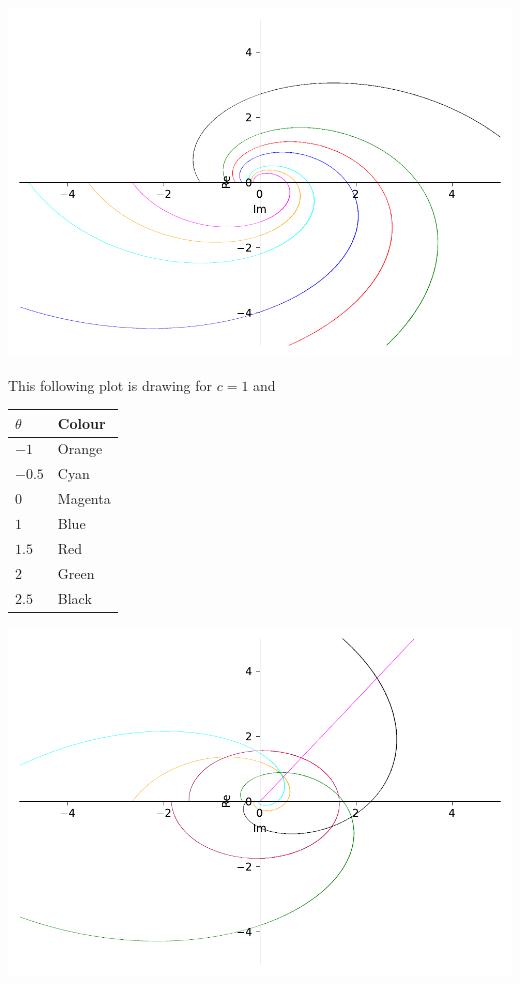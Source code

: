 \documentclass[
]{book}
\theoremstyle{definition}
\theoremstyle{definition}
\theoremstyle{definition}
\theoremstyle{definition}
\theoremstyle{remark}
\begin{document}
\includegraphics{ConformalMapping_files/figure-latex/unnamed-chunk-65-17.pdf}

This following plot is drawing for \(c=1\) and

\begin{longtable}[]{@{}ll@{}}
\toprule\noalign{}
\(\theta\) & Colour \\
\midrule\noalign{}
\endhead
\bottomrule\noalign{}
\endlastfoot
\(-1\) & Orange \\
\(-0.5\) & Cyan \\
\(0\) & Magenta \\
\(1\) & Blue \\
\(1.5\) & Red \\
\(2\) & Green \\
\(2.5\) & Black \\
\end{longtable}

\includegraphics{ConformalMapping_files/figure-latex/unnamed-chunk-66-19.pdf}
\end{document}
